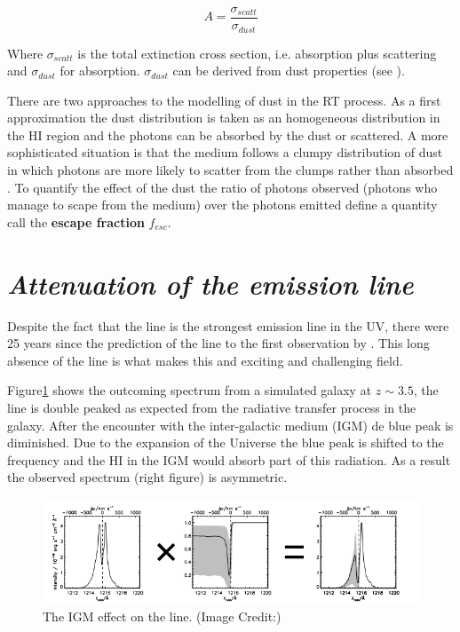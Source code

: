 \begin{equation}
A = \dfrac{\sigma_{scatt}}{\sigma_{dust}}
\end{equation}

Where $\sigma_{scatt}$ is the total extinction cross section, i.e. 
absorption plus scattering 
and $\sigma_{dust}$ for absorption. $\sigma_{dust}$ can be derived from 
dust properties (see \citep{Laursen09}). 

There are two approaches to the modelling of dust in the \ly RT process.
As a first approximation the dust distribution is taken as an homogeneous distribution 
in the HI region and 
the \ly photons can be absorbed by the dust or scattered. A more
sophisticated situation is that the medium follows a clumpy distribution
of dust in which \ly photons are more likely to scatter from the 
clumps rather than absorbed \citep{Laursen13}. To quantify the effect of 
the dust the ratio
of \ly photons observed (\ly photons who manage to scape from the medium) 
over the \ly photons emitted define a quantity call the {\bf{escape fraction}} $f_{esc}$. 






\section{\emph{Attenuation of the \ly emission line}}

Despite the fact that the \ly line is the strongest emission line in 
the UV, there were 25 years since the prediction of the \ly line to 
the first observation by \citep{DjorgovskiThomson92}. 
This long absence of the \ly line is what makes this and exciting and 
challenging field.

Figure\ref{fig:IGM} shows the outcoming spectrum from a simulated galaxy 
at $z \sim 3.5$, the line is double peaked as expected from 
the radiative transfer process in the galaxy. After the encounter
with the inter-galactic medium (IGM) de blue peak is diminished.
Due to the expansion of the Universe the blue peak 
is shifted to the \ly frequency and the HI in the IGM would absorb
part of this radiation. As a result the observed spectrum (right figure)
is asymmetric.   

\begin{figure}[H]
\begin{center}
\includegraphics[scale=0.6]{Figures/ISM.png}
\end{center}\caption{The IGM effect on the \ly line. (Image Credit:\citep{Laursen09})\label{fig:IGM}}
\end{figure}


